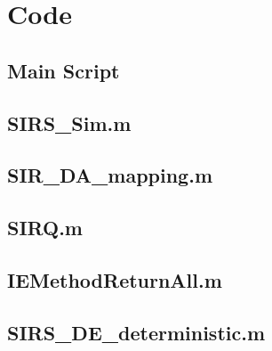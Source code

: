 \documentclass{/home/janmebows/Documents/LatexTemplates/myassignment}
\begin{document}
\clearpage
\appendix
\section{Code}
\label{code:main}
\subsection{Main Script}

\label{code:SIRSsim}
\subsection{SIRS\_Sim.m}

\label{code:DAmap}
\subsection{SIR\_DA\_mapping.m}

\label{code:Qmat}
\subsection{SIRQ.m}

\label{code:IEMethodReturnAll}
\subsection{IEMethodReturnAll.m}

\label{code:deterministic}
\subsection{SIRS\_DE\_deterministic.m}

	



\clearpage

\end{document}
